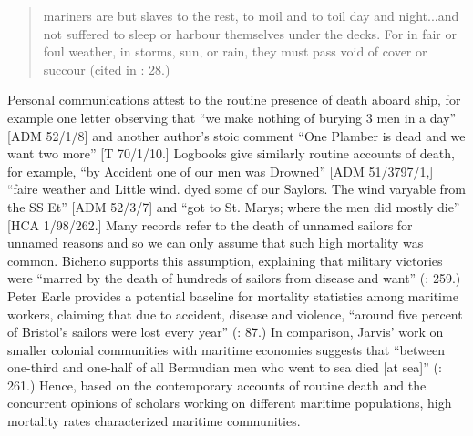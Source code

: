 \begin{quotation}
mariners are but slaves to the rest, to moil and to toil day and night...and not suffered to sleep or harbour themselves under the decks. For in fair or foul weather, in storms, sun, or rain, they must pass void of cover or succour (cited in \citealt{Lavery2009}: 28.) \end{quotation}

Personal communications attest to the routine presence of death aboard ship, for example one letter observing that “we make nothing of burying 3 men in a day” [ADM 52/1/8] and another author’s stoic comment “One Plamber is dead and we want two more” [T 70/1/10.] Logbooks give similarly routine accounts of death, for example, “by Accident one of our men was Drowned” [ADM 51/3797/1,] “faire weather and Little wind. dyed some of our Saylors. The wind varyable from the SS Et” [ADM 52/3/7] and “got to St. Marys; where the men did mostly die” [HCA 1/98/262.] Many records refer to the death of unnamed sailors for unnamed reasons and so we can only assume that such high mortality was common. Bicheno supports this assumption, explaining that  military victories were “marred by the death of hundreds of sailors from disease and want” (\citeyear*{Bicheno2012}: 259.) Peter Earle provides a potential baseline for mortality statistics among maritime workers, claiming that due to accident, disease and violence, “around five percent of Bristol’s sailors were lost every year” (\citeyear*{Earle1998}: 87.) In comparison, Jarvis’ work on smaller colonial communities with maritime economies suggests that “between one-third and one-half of all Bermudian men who went to sea died [at sea]” (\citeyear*{Jarvis2010}: 261.) Hence, based on the contemporary accounts of routine death and the concurrent opinions of scholars working on different maritime populations, high mortality rates characterized maritime communities. 


